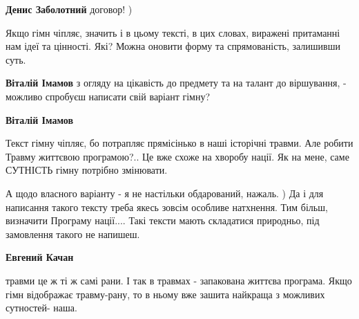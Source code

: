 \begin{itemize}
\begin{itemize}
\textbf{Денис Заболотний} договор! )
\end{itemize}

 

Якщо гімн чіпляє, значить і в цьому тексті, в цих словах, виражені притаманні нам ідеї та цінності. Які?
Можна оновити форму та спрямованість, залишивши суть.

\begin{itemize}
 
\textbf{Віталій Імамов} з огляду на цікавість до предмету та на талант до віршування, - можливо спробуєш написати свій варіант гімну?

 
\textbf{Віталій Імамов} 

Текст гімну чіпляє, бо потрапляє прямісінько в наші історічні травми. Але
робити Травму життєвою програмою?.. Це вже схоже на хворобу нації. Як на мене,
саме СУТНІСТЬ гімну потрібно змінювати.

А щодо власного варіанту - я не настільки обдарований, нажаль. ) Да і для
написання такого тексту треба якесь зовсім особливе натхнення. Тим більш,
визначити Програму нації.... Такі тексти мають складатися природньо, під
замовлення такого не напишеш.


 
\textbf{Евгений Качан} 

травми це ж ті ж самі рани. І так в травмах - запакована життєва програма. Якщо
гімн відображає травму-рану, то в ньому вже зашита найкраща з можливих
сутностей- наша.


\end{itemize}
\end{itemize}
